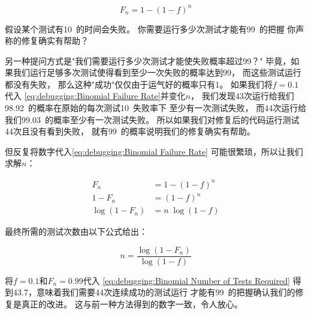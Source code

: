 \begin{equation}
	F_n = 1-\left(1-f\right)^n
\label{eq:debugging:Binomial Failure Rate}
\end{equation}

\QuickQuizEnd

假设某个测试有10\pct\ 的时间会失败。
你需要运行多少次测试才能有99\pct\ 的把握
你声称的修复确实有帮助？

另一种提问方式是"我们需要运行多少次测试才能使失败概率超过99\pct？"
毕竟，如果我们运行足够多次测试使得看到至少一次失败的概率达到99\pct，
而这些测试运行都没有失败，
那么这种"成功"仅仅由于运气好的概率只有1\pct。
如果我们将$f=0.1$代入
\cref{eq:debugging:Binomial Failure Rate}并变化$n$，
我们发现43次运行给我们98.92\pct\ 的概率在原始的每次测试10\pct\ 失败率下
至少有一次测试失败，
而44次运行给我们99.03\pct\ 的概率至少有一次测试失败。
所以如果我们对修复后的代码运行测试44次且没有看到失败，
就有99\pct\ 的概率说明我们的修复确实有帮助。

但反复将数字代入\cref{eq:debugging:Binomial Failure Rate}
可能很繁琐，所以让我们求解$n$：

\begin{align}
	F_n & = 1-\left(1-f\right)^n \\
	1 - F_n & = \left(1-f\right)^n \\
	\log \left(1 - F_n\right) & = n \; \log \left(1 - f\right)
\end{align}

最终所需的测试次数由以下公式给出：

\begin{equation}
	n = \frac{\log\left(1 - F_n\right)}{\log\left(1 - f\right)}
\label{eq:debugging:Binomial Number of Tests Required}
\end{equation}

将$f=0.1$和$F_n=0.99$代入
\cref{eq:debugging:Binomial Number of Tests Required}
得到43.7，意味着我们需要44次连续成功的测试运行
才能有99\pct\ 的把握确认我们的修复是真正的改进。
这与前一种方法得到的数字一致，令人放心。

\QuickQuizEnd

